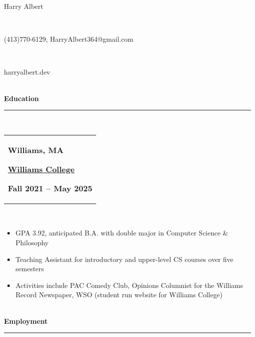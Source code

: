 \documentclass[10pt]{article}
\begin{document}
\thispagestyle{empty}
\vspace{-\baselineskip}
\begin{center}
\Large Harry Albert
\end{center}
\vspace{-6.5ex}~\\ 
\vspace{-\baselineskip}
\begin{center}
\normalsize (413)770-6129, HarryAlbert364@gmail.com
\end{center}
\vspace{-6ex}~\\ 
\vspace{-\baselineskip}
\begin{center}
\normalsize harryalbert.dev
\end{center}
\vspace{-6ex}~\\ 
\textbf{Education}\\[-2ex]
\rule{\textwidth}{0.4pt}\\ 
\begin{tabular}{@{}p{\textwidth}}\begin{minipage}[t]{0.333\textwidth}
\raggedright
\textbf{Williams, MA}
\end{minipage}%
\begin{minipage}[t]{0.333\textwidth}
\centering
\textbf{\underline{Williams College}}
\end{minipage}%
\begin{minipage}[t]{0.333\textwidth}
\raggedleft
\textbf{Fall 2021 – May 2025}
\end{minipage}%
\end{tabular}\\[0.5ex]
\vspace{-\baselineskip}
\begin{itemize}[itemsep=0pt, topsep=0pt]
\item GPA 3.92, anticipated B.A. with double major in Computer Science \& Philosophy
\item Teaching Assistant for introductory and upper-level CS courses over five semesters
\item Activities include PAC Comedy Club, Opinions Columnist for the Williams Record Newspaper, WSO (student run website for Williams College)
\end{itemize}~\\[-1ex]
\textbf{Employment}\\[-2ex]
\rule{\textwidth}{0.4pt}\\ 
\end{document}
